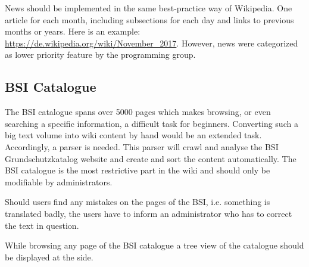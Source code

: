 \begin{tcolorbox}[breakable,colback=red!14,colframe=red!40!black,title=UPDATE 30/11/2017]
News should be implemented in the same best-practice way of Wikipedia.
One article for each month, including subsections for each day and links to previous months or years.
Here is an example:  \url{https://de.wikipedia.org/wiki/November_2017}.
However, news were categorized as lower priority feature by the programming group. 
\end{tcolorbox}


\subsection{BSI Catalogue}
\label{BSIc}
The BSI catalogue spans over 5000 pages which makes browsing, or even searching a specific information, a difficult task for beginners. 
Converting such a big text volume into wiki content by hand would be an extended task. 
Accordingly, a parser is needed. 
This parser will crawl and analyse the BSI Grundschutzkatalog website and create and sort the content automatically. 
The BSI catalogue is the most restrictive part in the wiki and should only be modifiable by administrators.
\begin{tcolorbox}[breakable,colback=red!12,colframe=red!40!black,title=UPDATE 15/11/2017]
    Should users find any mistakes on the pages of the BSI, i.e. something is translated badly, the users have to inform an administrator who has to correct the text in question.
\end{tcolorbox}
\bigskip

While browsing any page of the BSI catalogue a tree view of the catalogue should be displayed at the side.
\bigskip

